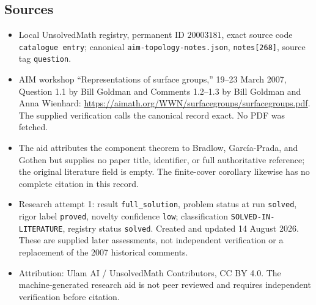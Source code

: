 \documentclass[11pt]{article}
\begin{document}
\subsection{Sources}
\begin{itemize}
\item Local UnsolvedMath registry, permanent ID \(20003181\), exact source code \texttt{catalogue entry}; canonical \texttt{aim-topology-notes.json}, \texttt{notes[268]}, source tag \texttt{question}.
\item AIM workshop ``Representations of surface groups,'' 19--23 March 2007, Question 1.1 by Bill Goldman and Comments 1.2--1.3 by Bill Goldman and Anna Wienhard: \url{https://aimath.org/WWN/surfacegroups/surfacegroups.pdf}. The supplied verification calls the canonical record exact. No PDF was fetched.
\item The aid attributes the component theorem to Bradlow, Garc\'ia-Prada, and Gothen but supplies no paper title, identifier, or full authoritative reference; the original literature field is empty. The finite-cover corollary likewise has no complete citation in this record.
\item Research attempt 1: result \texttt{full\_solution}, problem status at run \texttt{solved}, rigor label \texttt{proved}, novelty confidence \texttt{low}; classification \texttt{SOLVED-IN-LITERATURE}, registry status \texttt{solved}. Created and updated 14 August 2026. These are supplied later assessments, not independent verification or a replacement of the 2007 historical comments.
\item Attribution: Ulam AI / UnsolvedMath Contributors, CC BY 4.0. The machine-generated research aid is not peer reviewed and requires independent verification before citation.
\end{itemize}
\end{document}
